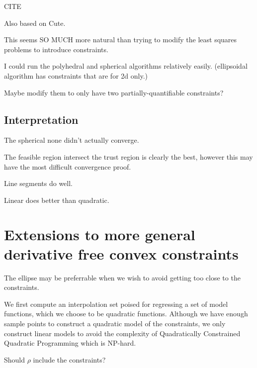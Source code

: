 \documentclass{article}
\theoremstyle{case}
\begin{document}
CITE

Also based on Cute.

This seems SO MUCH more natural than trying to modify the least squares problems to introduce constraints.

I could run the polyhedral and spherical algorithms relatively easily. (ellipsoidal algorithm has constraints that are for 2d only.)

Maybe modify them to only have two partially-quantifiable constraints?



\newpage

\subsection{Interpretation}

The spherical none didn't actually converge.

The feasible region intersect the trust region is clearly the best, however this may have the most difficult convergence proof.

Line segments do well.

Linear does better than quadratic.


\section{Extensions to more general derivative free convex constraints}


The ellipse may be preferrable when we wish to avoid getting too close to the constraints.

We first compute an interpolation set poised for regressing a set of model functions, which we choose to be quadratic functions.
Although we have enough sample points to construct a quadratic model of the constraints, we only construct linear models to avoid the complexity of Quadratically Constrained Quadratic Programming which is NP-hard.

Should $\rho$ include the constraints?



\newpage

\appendix
\end{document}
